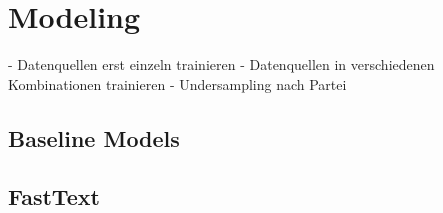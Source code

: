 \section{Modeling} \label{sec:modeling}

- Datenquellen erst einzeln trainieren
- Datenquellen in verschiedenen Kombinationen trainieren
- Undersampling nach Partei 



\subsection{Baseline Models}

\subsection{FastText}


